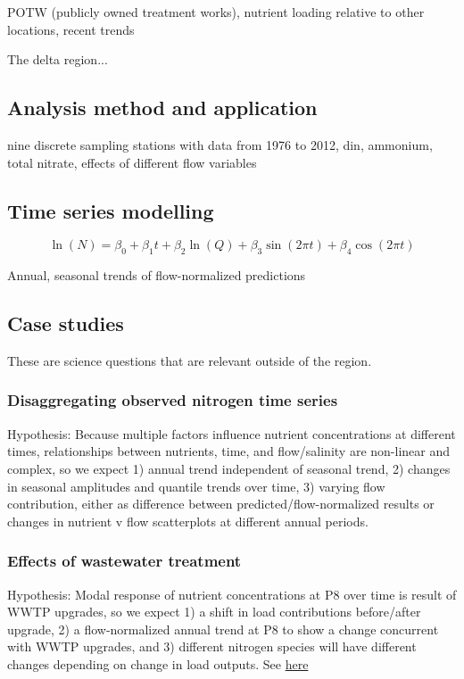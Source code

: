 \documentclass[letterpaper,12pt,oneside]{article}\usepackage[]{graphicx}\usepackage[]{color}
\begin{document}
POTW (publicly owned treatment works), nutrient loading relative to other locations, recent trends

The delta region...

\subsection{Analysis method and application}

nine discrete sampling stations with data from 1976 to 2012, \ac{din}, ammonium, total nitrate, effects of different flow variables

\subsection{Time series modelling}

\begin{equation}
\ln\left(N\right) = \beta_0 + \beta_1 t + \beta_2 \ln\left(Q\right) + \beta_3 \sin\left(2\pi t\right) + \beta_4 \cos\left(2\pi t\right)
\end{equation}  

Annual, seasonal trends of flow-normalized predictions

\subsection{Case studies}
These are science questions that are relevant outside of the region.
\subsubsection{Disaggregating observed nitrogen time series}
Hypothesis: Because multiple factors influence nutrient concentrations at different times, relationships between nutrients, time, and flow/salinity are non-linear and complex, so we expect 1) annual trend independent of seasonal trend, 2) changes in seasonal amplitudes and quantile trends over time, 3) varying flow contribution, either as difference between predicted/flow-normalized results or changes in nutrient v flow scatterplots at different annual periods.
\subsubsection{Effects of wastewater treatment}
Hypothesis: Modal response of nutrient concentrations at P8 over time is result of WWTP upgrades, so we expect 1) a shift in load contributions before/after upgrade, 2) a flow-normalized annual trend at P8 to show a change concurrent with WWTP upgrades, and 3) different nitrogen species will have different changes depending on change in load outputs. See \href{http://www.waterboards.ca.gov/centralvalley/board_decisions/adopted_orders/san_joaquin/r5-2008-0086_res.pdf}{here}
\end{document}
